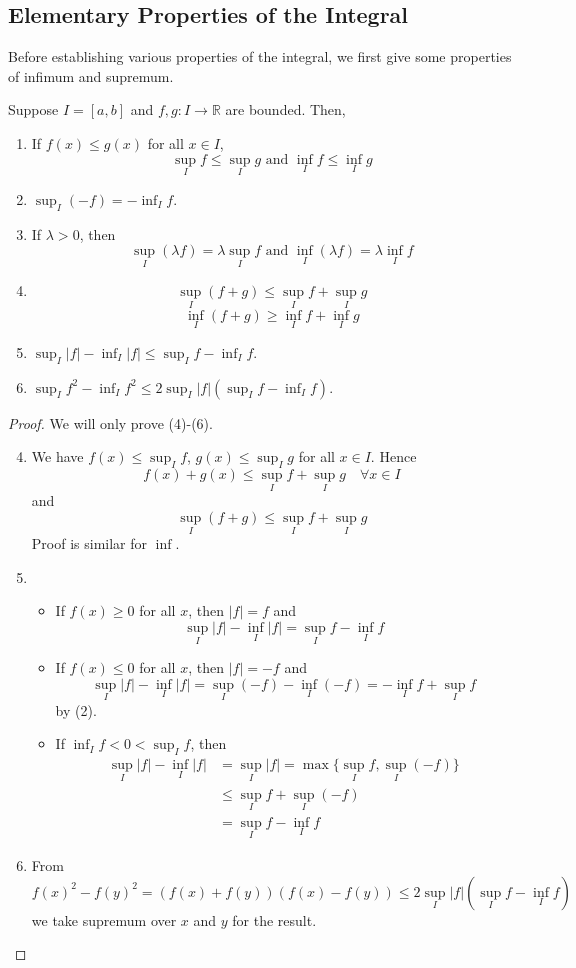 \documentclass[10pt, a4paper, twoside]{report}
\begin{document}
\subsection{Elementary Properties of the Integral}
Before establishing various properties of the integral, we first give some properties of infimum and supremum.
\begin{lemma}
    Suppose \(I=[a,b]\) and \(f,g:I\to\mathbb{R}\) are bounded. Then,
    \begin{enumerate}
        \item If \(f(x)\leq g(x)\) for all \(x\in I\), 
        \[\sup_If\leq\sup_Ig\text{  and  }\inf_If\leq\inf_Ig\]
        \item \(\sup_I(-f)=-\inf_If\).
        \item If \(\lambda>0\), then \[\sup_I(\lambda f)=\lambda\sup_If\text{  and  }\inf_I(\lambda f)=\lambda\inf_If\]
        \item \[\sup_I(f+g)\leq\sup_If+\sup_Ig\]
        \[\inf_I(f+g)\geq\inf_If+\inf_Ig\]
        \item \(\sup_I|f|-\inf_I|f|\leq\sup_If-\inf_If\).
        \item \(\sup_If^2-\inf_If^2\leq 2\sup_I|f|(\sup_If-\inf_If)\).
    \end{enumerate}
    \label{lemma:supinf_property}
\end{lemma}
\begin{proof}
    We will only prove (4)-(6).
    \begin{enumerate}
        \setcounter{enumi}{3}
        \item We have \(f(x)\leq\sup_If\), \(g(x)\leq\sup_Ig\) for all \(x\in I\). Hence 
        \[f(x)+g(x)\leq\sup_If+\sup_Ig\quad\forall x\in I\]
        and 
        \[\sup_I(f+g)\leq\sup_If+\sup_Ig\]
        Proof is similar for \(\inf\).
        \item \begin{itemize}
            \item If \(f(x)\geq 0\) for all \(x\), then \(|f|=f\) and 
            \[\sup_I|f|-\inf_I|f|=\sup_If-\inf_If\]
            \item If \(f(x)\leq 0\) for all \(x\), then \(|f|=-f\) and 
            \[\sup_I|f|-\inf_I|f|=\sup_I(-f)-\inf_I(-f)=-\inf_If+\sup_If\]
            by (2).
            \item If \(\inf_If<0<\sup_If\), then 
            \begin{align*}
                \sup_I|f|-\inf_I|f|&=\sup_I|f|=\max\{\sup_If,\sup_I(-f)\} \\
                &\leq\sup_If+\sup_I(-f) \\
                &=\sup_If-\inf_If 
            \end{align*}
        \end{itemize}
        \item From \[f(x)^2-f(y)^2=(f(x)+f(y))(f(x)-f(y))\leq 2\sup_I|f|(\sup_If-\inf_If)\]
        we take supremum over \(x\) and \(y\) for the result.
    \end{enumerate}
\end{proof}
\end{document}
